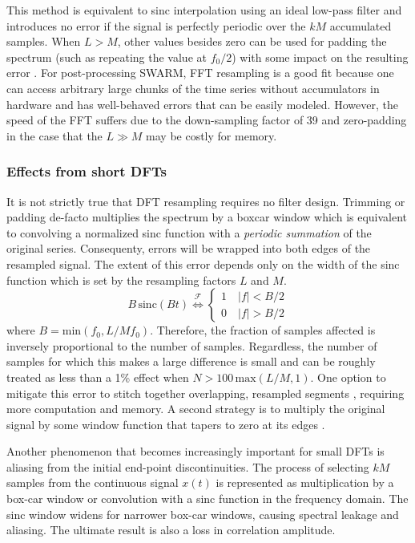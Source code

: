 \documentclass[11pt,preprint]{aastex}
\begin{document}
This method is equivalent to sinc interpolation using an ideal low-pass filter and introduces no 
error if the signal is perfectly periodic over the $kM$ accumulated samples.  When $L>M$, other values besides 
zero can 
be used for padding the spectrum (such as repeating the value at $f_0/2$) with some impact on the resulting 
error \citep{fraser89,bi11}.  For post-processing SWARM, FFT resampling is a good fit because one can 
access arbitrary large chunks of the time series without accumulators in hardware and has well-behaved errors
that can be easily modeled.  However, the speed of the FFT suffers due to the down-sampling factor of 39 and 
zero-padding in the case that the $L\gg M$ may be costly for memory.

\subsubsection{Effects from short DFTs}

It is not strictly true that DFT resampling requires no filter design. Trimming or padding de-facto multiplies 
the spectrum by a boxcar window which is equivalent to convolving a normalized sinc function with a 
\emph{periodic summation} of the original series.
Consequenty, errors will be wrapped into both edges of the 
resampled signal.  The extent of this error 
depends only on the width of the sinc function which is set by the resampling factors $L$ and $M$.  
\begin{equation} \label{eq:sinc}
B\,\mathrm{sinc}(B t) \overset{\mathcal{F}}{\Longleftrightarrow} \begin{cases} 1 \quad |f| < B/2 \\ 0 \quad |f| > B/2 \end{cases}
\end{equation}
where $B = \mathrm{min}(f_0,L/Mf_0)$.  
Therefore, the fraction of samples affected is inversely proportional to the number of samples.  Regardless, the 
number of samples for which this makes a large difference is small and can be roughly treated as less than a 
1\% effect when $N > 100\,\mathrm{max}(L/M,1)$.  One option to mitigate this error to stitch together 
overlapping, resampled segments \citep{bi11}, requiring more computation and memory.  A second strategy is to 
multiply the original signal by some window function that tapers to zero at its edges \citep{fraser89}.

Another phenomenon that becomes increasingly important for small DFTs is aliasing from the initial end-point
discontinuities.  The process of selecting $kM$ samples from the continuous signal $x(t)$ is represented as 
multiplication by a box-car window or convolution with a sinc function in the frequency domain.  The sinc window
widens for narrower box-car windows, causing spectral leakage and aliasing.  The ultimate result is also a loss 
in correlation amplitude.
\end{document}
